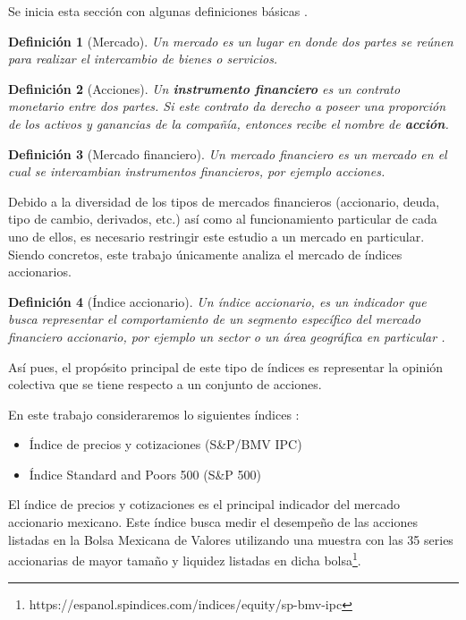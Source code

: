 \documentclass[12pt]{report}
\theoremstyle{break}
\newtheorem{definicion}{Definición}[chapter]
\theoremstyle{break}
\begin{document}
Se inicia esta sección con algunas definiciones básicas \cite{CFA2019-market-org}.

\begin{definicion}[Mercado]
\label{definicion:mercado}
Un mercado es un lugar en donde dos partes se reúnen para realizar el intercambio de bienes o servicios.
\end{definicion}

\begin{definicion}[Acciones]
\label{definicion:instrumento-financiero}
Un \textbf{instrumento financiero} es un contrato monetario entre dos partes. Si este contrato da derecho a poseer una proporción de los activos y ganancias de la compañía, entonces recibe el nombre de \textbf{acción}.
\end{definicion}

\begin{definicion}[Mercado financiero]
\label{definicion:mercado-financiero}
Un mercado financiero es un mercado en el cual se intercambian instrumentos financieros, por ejemplo acciones.
\end{definicion}

Debido a la diversidad de los tipos de mercados financieros (accionario, deuda, tipo de cambio, derivados, etc.) así como al funcionamiento particular de cada uno de ellos, es necesario restringir este estudio a un mercado en particular. Siendo concretos, este trabajo únicamente analiza el mercado de índices accionarios.

\begin{definicion}[Índice accionario]
\label{definicion:indice-accionario}
Un índice accionario, es un indicador que busca representar el comportamiento de un segmento específico del mercado financiero accionario, por ejemplo un sector o un área geográfica en particular \cite{CFA2019-market-index}.
\end{definicion}

Así pues, el propósito principal de este tipo de índices es representar la opinión colectiva que se tiene respecto a un conjunto de acciones.

En este trabajo consideraremos lo siguientes índices :

\begin{itemize}
\item Índice de precios y cotizaciones (S\&P/BMV IPC)
\item Índice Standard and Poors 500 (S\&P 500)
\end{itemize}

El índice de precios y cotizaciones es el principal indicador del mercado accionario mexicano. Este índice busca medir el desempeño de las acciones listadas en la Bolsa Mexicana de Valores utilizando una muestra con las 35 series accionarias de mayor tamaño y liquidez listadas en dicha bolsa\footnote{https://espanol.spindices.com/indices/equity/sp-bmv-ipc}.
\end{document}

